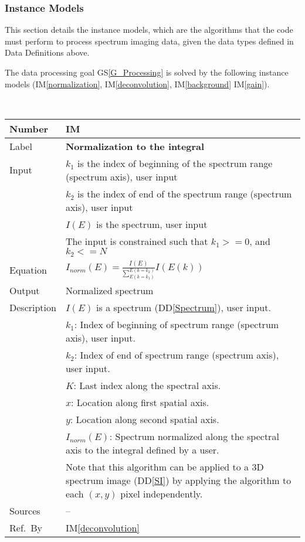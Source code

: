 \documentclass[12pt]{article}
\newcommand{\colAwidth}{0.13\textwidth}
\newcommand{\colBwidth}{0.82\textwidth}
\newcommand{\ddref}[1]{DD\ref{#1}}
\newcommand{\gsref}[1]{GS\ref{#1}}
\newcounter{instnum} %
\newcommand{\iref}[1]{IM\ref{#1}}
\begin{document}
\subsubsection{Instance Models} \label{sec_instance}    

This section details the instance models, which are the algorithms that the code
must perform to process spectrum imaging data, given the data types defined in
Data Definitions above.

The data processing goal \gsref{G_Processing} is solved by the following
instance models (\iref{normalization}, \iref{deconvolution}, \iref{background}
\iref{gain}).

~\newline


\noindent
\begin{minipage}{\textwidth}
	\renewcommand*{\arraystretch}{1.5}
	\begin{tabular}{| p{\colAwidth} | p{\colBwidth}|}
		  \hline
		  \rowcolor[gray]{0.9}
		  Number& IM{instnum}\theinstnum \label{normalization}\\
		  \hline
		  Label& \bf Normalization to the integral\\
		  \hline
		  Input& $k_1$  is the index of beginning of the spectrum range (spectrum
axis), user input\\
		  & $k_2$ is the index of end of the spectrum range (spectrum axis), user
input\\
		  & $I(E)$ is the spectrum, user input\\
		  & The input is constrained such that $k_1 >= 0$, and $k_2 <= N$\\
		  \hline
		  Equation & $I_{norm}(E)=\frac{I(E)}{\sum_{E(k=k_1)}^{E(k=k_2)}} I(E(k))$\\
		  \hline
		  Output & Normalized spectrum\\
		  \hline
		  Description&$I(E)$ is a spectrum (\ddref{Spectrum}), user input.\\
		  &$k_1$: Index of beginning of spectrum range (spectrum axis), user input.\\
		  &$k_2$: Index of end of spectrum range (spectrum axis), user input.\\
		  &$K$: Last index along the spectral axis.\\
		  &$x$: Location along first spatial axis.\\
		  &$y$: Location along second spatial axis.\\
		  &$I_{norm}(E)$: Spectrum normalized along the spectral axis to the integral
defined by a user.\\
		  & Note that this algorithm can be applied to a 3D spectrum image
(\ddref{SI}) by applying the algorithm to each $(x,y)$ pixel independently.\\
		  \hline
		  Sources & -- \\
		  \hline
		  Ref.\ By & \iref{deconvolution}\\
		  \hline
	\end{tabular}
\end{minipage}\\
\end{document}
